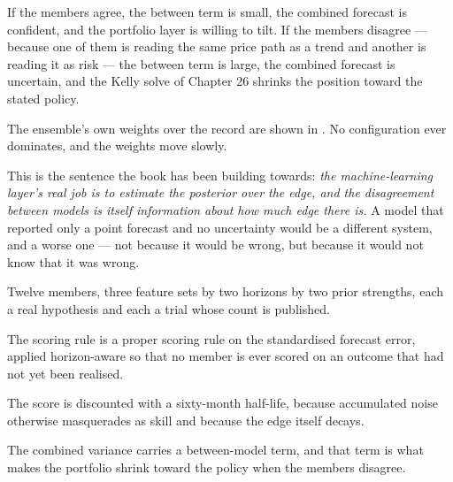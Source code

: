 If the members agree, the between term is small, the combined forecast is
confident, and the portfolio layer is willing to tilt. If the members
disagree --- because one of them is reading the same price path as a trend
and another is reading it as risk --- the between term is large, the
combined forecast is uncertain, and the Kelly solve of Chapter 26
shrinks the position toward the stated policy.

The ensemble's own weights over the record are shown in . No configuration ever dominates, and the weights move slowly.

This is the sentence the book has been building towards: \emph{the
machine-learning layer's real job is to estimate the posterior over the
edge, and the disagreement between models is itself information about how
much edge there is.} A model that reported only a point forecast and no
uncertainty would be a different system, and a worse one --- not because
it would be wrong, but because it would not know that it was wrong.

\begin{keytakeaways}
\item Twelve members, three feature sets by two horizons by two prior
strengths, each a real hypothesis and each a trial whose count is
published.
\item The scoring rule is a proper scoring rule on the standardised
forecast error, applied horizon-aware so that no member is ever scored on
an outcome that had not yet been realised.
\item The score is discounted with a sixty-month half-life, because
accumulated noise otherwise masquerades as skill and because the edge
itself decays.
\item The combined variance carries a between-model term, and that term is
what makes the portfolio shrink toward the policy when the members
disagree.
\end{keytakeaways}

